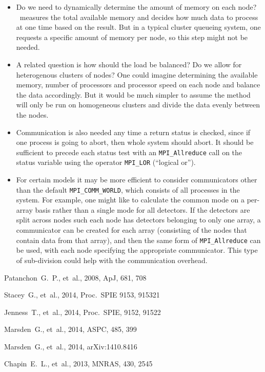 \documentclass[oneside,11pt]{starlink}
\begin{document}
\begin{itemize}

\item Do we need to dynamically determine the amount of memory on each
  node? \makemap\ measures the total available memory and decides how
  much data to process at one time based on the result. But in a
  typical cluster queueing system, one requests a specific amount of
  memory per node, so this step might not be needed.

\item A related question is how should the load be balanced? Do we
  allow for heterogenous clusters of nodes? One could imagine
  determining the available memory, number of processors and processor
  speed on each node and balance the data accordingly. But it would
  be much simpler to assume the method will only be run on homogeneous
  clusters and divide the data evenly between the nodes.

\item Communication is also needed any time a return status is
  checked, since if one process is going to abort, then whole system
  should abort. It should be sufficient to precede each status test
  with an \verb+MPI_Allreduce+ call on the status variable using the
  operator \verb+MPI_LOR+ (``logical or'').

\item For certain models it may be more efficient to consider
  communicators other than the default \verb+MPI_COMM_WORLD+, which
  consists of all processes in the system. For example, one might like
  to calculate the common mode on a per-array basis rather than a
  single mode for all detectors. If the detectors are split across
  nodes such each node has detectors belonging to only one array, a
  communicator can be created for each array (consisting of the nodes
  that contain data from that array), and then the same form
  of \verb+MPI_Allreduce+ can be used, with each node specifying the
  appropriate communicator. This type of sub-division could help with
  the communication overhead.

\end{itemize}


\begin{thebibliography}{}

Patanchon~G.~P., et~al., 2008, ApJ, 681, 708

Stacey~G., et~al., 2014, Proc.\ SPIE 9153, 915321

Jenness~T., et~al., 2014, Proc.\ SPIE, 9152, 91522

Marsden~G., et~al., 2014, ASPC, 485, 399

Marsden~G., et~al., 2014, arXiv:1410.8416

Chapin~E.~L., et~al., 2013, MNRAS, 430, 2545

\end{thebibliography}
\end{document}
